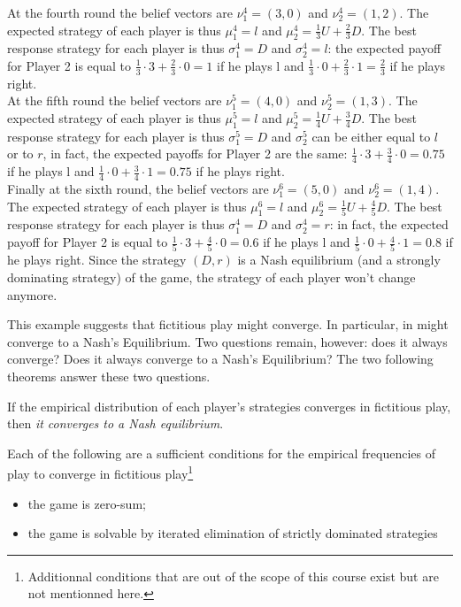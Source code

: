 \begin{example}
At the fourth round the belief vectors are $\nu_1^4=(3,0)$ and $\nu_2^4=(1,2)$.
The expected strategy of each player is thus $\mu_1^4=l$ and
$\mu_2^4=\frac{1}{3}U+\frac{2}{3}D$. The best response strategy for each
player is thus $\sigma_1^4=D$ and $\sigma_2^4=l$: the expected payoff for
Player 2 is equal to $\frac{1}{3}\cdot3+\frac{2}{3}\cdot0=1$ if he plays l and
$\frac{1}{3}\cdot0+\frac{2}{3}\cdot1=\frac{2}{3}$ if he plays right.\\

At the fifth round the belief vectors are $\nu_1^5=(4,0)$ and $\nu_2^5=(1,3)$.
The expected strategy of each player is thus $\mu_1^5=l$ and
$\mu_2^5=\frac{1}{4}U+\frac{3}{4}D$. The best response strategy for each
player is thus $\sigma_1^5=D$ and $\sigma_2^5$ can be either equal to $l$
or to $r$, in fact, the expected payoffs for Player 2 are the same:
$\frac{1}{4}\cdot3+\frac{3}{4}\cdot0=0.75$ if he plays l and
$\frac{1}{4}\cdot0+\frac{3}{4}\cdot1=0.75$ if he plays right.\\

Finally at the sixth round, the belief vectors are $\nu_1^6=(5,0)$ and
$\nu_2^6=(1,4)$. The expected strategy of each player is thus $\mu_1^6=l$
and $\mu_2^6=\frac{1}{5}U+\frac{4}{5}D$. The best response strategy for
each player is thus $\sigma_1^4=D$ and $\sigma_2^4=r$: in fact,  the
expected payoff for Player 2 is equal to $\frac{1}{5}\cdot3+\frac{4}{5}\cdot0=0.6$
if he plays l and $\frac{1}{5}\cdot0+\frac{4}{5}\cdot1=0.8$ if he plays right.
Since the strategy $(D,r)$ is a Nash equilibrium (and a strongly dominating
strategy) of the game, the strategy of each player won't change anymore.\\
\end{example}

This example suggests that fictitious play might converge. In particular,
in might converge to a Nash's Equilibrium. Two questions remain, however:
does it always converge? Does it always converge to a Nash's Equilibrium?
The two following theorems answer these two questions.

\begin{theorem}
    \label{thm:fpconvergence}
    If the empirical distribution of each player's strategies converges in
    fictitious play, then \emph{it converges to a Nash equilibrium}.
\end{theorem}

\begin{theorem}
    \label{thm:fpconvergencecond}
    Each of the following are a sufficient conditions for the empirical
    frequencies of play to converge in fictitious play\footnote{Additionnal
    conditions that are out of the scope of this course exist but are not
    mentionned here.}
    \begin{itemize}
        \item the game is zero-sum;
        \item the game is solvable by iterated elimination of strictly dominated strategies
    \end{itemize}
\end{theorem}

